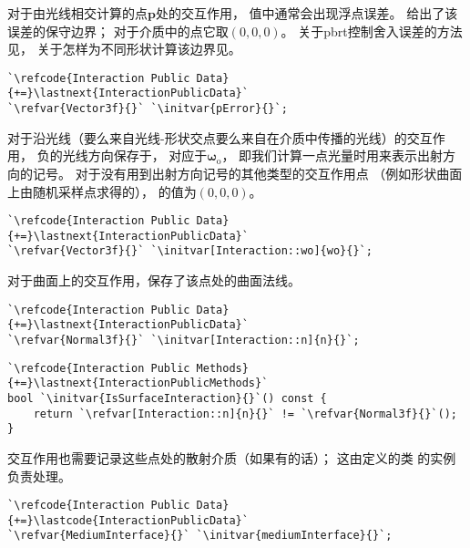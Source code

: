 对于由光线相交计算的点$\bm p$处的交互作用，
值中通常会出现浮点误差。
给出了该误差的保守边界；
对于介质中的点它取$(0,0,0)$。
关于pbrt控制舍入误差的方法见，
关于怎样为不同形状计算该边界见。
\begin{lstlisting}
`\refcode{Interaction Public Data}{+=}\lastnext{InteractionPublicData}`
`\refvar{Vector3f}{}` `\initvar{pError}{}`;
\end{lstlisting}

对于沿光线（要么来自光线-形状交点要么来自在介质中传播的光线）的交互作用，
负的光线方向保存于，
对应于$\bm \omega_{\mathrm{o}}$，
即我们计算一点光量时用来表示出射方向的记号。
对于没有用到出射方向记号的其他类型的交互作用点
（例如形状曲面上由随机采样点求得的），
的值为$(0,0,0)$。
\begin{lstlisting}
`\refcode{Interaction Public Data}{+=}\lastnext{InteractionPublicData}`
`\refvar{Vector3f}{}` `\initvar[Interaction::wo]{wo}{}`;
\end{lstlisting}

对于曲面上的交互作用，保存了该点处的曲面法线。
\begin{lstlisting}
`\refcode{Interaction Public Data}{+=}\lastnext{InteractionPublicData}`
`\refvar{Normal3f}{}` `\initvar[Interaction::n]{n}{}`;
\end{lstlisting}
\begin{lstlisting}
`\refcode{Interaction Public Methods}{+=}\lastnext{InteractionPublicMethods}`
bool `\initvar{IsSurfaceInteraction}{}`() const {
    return `\refvar[Interaction::n]{n}{}` != `\refvar{Normal3f}{}`();
}
\end{lstlisting}

交互作用也需要记录这些点处的散射介质（如果有的话）；
这由定义的类
的实例负责处理。
\begin{lstlisting}
`\refcode{Interaction Public Data}{+=}\lastcode{InteractionPublicData}`
`\refvar{MediumInterface}{}` `\initvar{mediumInterface}{}`;
\end{lstlisting}

